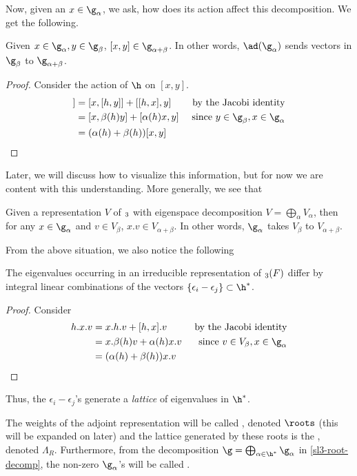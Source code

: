 \documentclass[11pt,leqno,oneside]{amsart}
\numberwithin{thm}{section}
\newcommand{\rootlattice}{\Lambda_R}
\begin{document}
Now, given an \(x \in \g_{\alpha}\), we ask, how does its action
affect this decomposition. We get the following.
\begin{prop}
  Given \(x \in \g_\alpha, y \in \g_\beta\), \([x,y] \in
  \g_{\alpha+\beta}\). In other words, \(\ad(\g_\alpha)\) sends
  vectors in \(\g_\beta\) to \(\g_{\alpha+\beta}\).
\end{prop}
\begin{proof}
  Consider the action of \(\h\) on \([x,y]\).
  \begin{align*}
    [h,[x,y]]
    & = [x,[h,y]] + [[h,x],y]
    & \text{ by the Jacobi identity}\\
    & = [x, \beta(h)y]+[\alpha(h)x,y]
    & \text{ since }y \in \g_\beta, x \in \g_\alpha\\
    & = (\alpha(h)+\beta(h))[x,y]
  \end{align*}
\end{proof}
Later, we will discuss how to visualize this information, but for now
we are content with this understanding. More generally, we see that
\begin{prop}
  Given a representation \(V\) of \(\sl_3\) with eigenspace
  decomposition \(V = \bigoplus_{\alpha} V_\alpha\), then for any \(x
  \in \g_\alpha\) and \(v \in V_\beta\), \(x.v \in
  V_{\alpha+\beta}\). In other words, \(\g_\alpha\) takes \(V_\beta\)
  to \(V_{\alpha+\beta}\).
\end{prop}
From the above situation, we also notice the following
\begin{prop}
  The eigenvalues occurring in an irreducible representation of
  \(\sl_3(F)\) differ by integral linear combinations of the vectors
  \(\{\epsilon_i-\epsilon_j\} \subset \h^*\). 
\end{prop}
\begin{proof}
  Consider
  \begin{align*}
    h.x.v & = x.h.v + [h,x].v
    & \text{ by the Jacobi identity}\\
          & = x.\beta(h)v + \alpha(h)x.v
    & \text{ since } v \in V_\beta, x \in \g_\alpha \\
    & = (\alpha(h)+\beta(h))x.v
  \end{align*}
\end{proof}
Thus, the \(\epsilon_i-\epsilon_j\)'s generate a \emph{lattice} of eigenvalues in \(\h^*\).
\begin{defn}
  The weights of the adjoint representation will be called ,
  denoted \(\roots\) (this will be expanded on later)
  and the lattice generated by these roots is the ,
  denoted \(\rootlattice\). Furthermore, from the decomposition \(\g =
  \bigoplus_{\alpha \in \h^*} \g_\alpha\) in \ref{sl3-root-decomp},
  the non-zero 
  \(\g_\alpha\)'s will be called .
\end{defn}
\end{document}
